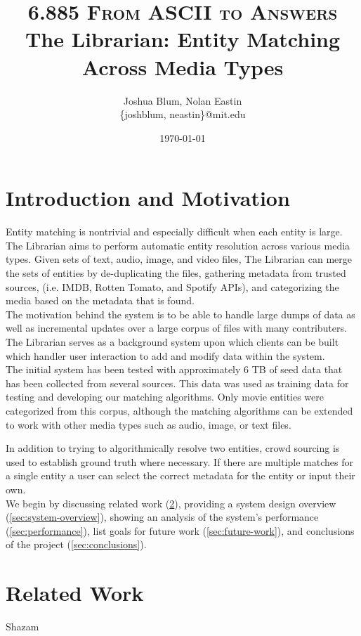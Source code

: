 \documentclass[paper=a4, fontsize=11pt]{scrartcl} %
\title{ 
\normalfont \normalsize 
\textsc{6.885 From ASCII to Answers} %
\horrule{0.5pt} %
\large The Librarian: Entity Matching Across Media Types %
\horrule{1pt} %
}
\author{Joshua Blum, Nolan Eastin \\ \{joshblum, neastin\}@mit.edu}
\date{\normalsize\today} %
\numberwithin{equation}{section} %
\numberwithin{figure}{section} %
\numberwithin{table}{section} %
\begin{document}
\maketitle %

\section{Introduction and Motivation}
Entity matching is nontrivial and especially difficult when each entity is large. The Librarian aims to perform automatic entity resolution across various media types. Given sets of text, audio, image, and video files, The Librarian can merge the sets of entities by de-­duplicating the files, gathering metadata from trusted sources, (i.e. IMDB, Rotten Tomato, and Spotify APIs), and categorizing the media based on the metadata that is found. \\

The motivation behind the system is to be able to handle large dumps of data as well as incremental updates over a large corpus of files with many contributers. The Librarian serves as a background system upon which clients can be built which handler user interaction to add and modify data within the system.\\

The initial system has been tested with approximately 6 TB of seed data that has been collected from several sources. This data was used as training data for testing and developing our matching algorithms. Only movie entities were categorized from this corpus, although the matching algorithms can be extended to work with other media types such as audio, image, or text files.

In addition to trying to algorithmically resolve two entities, crowd sourcing is used to establish ground truth where necessary. If there are multiple matches for a single entity a user can select the correct metadata for the entity or input their own.\\

We begin by discussing related work (\ref{sec:related-work}), providing a system design overview (\ref{sec:system-overview}), showing an analysis of the system's performance (\ref{sec:performance}), list goals for future work (\ref{sec:future-work}), and conclusions of the project (\ref{sec:conclusions}).

\section{Related Work}
\label{sec:related-work}
Shazam
\end{document}
